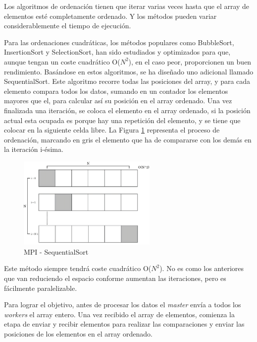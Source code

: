 	 


	
	
	Los algoritmos de ordenación tienen que iterar varias veces hasta que el array de elementos esté completamente ordenado. Y los métodos pueden variar considerablemente el tiempo de ejecución.
	
	Para las ordenaciones cuadráticas, los métodos populares como BubbleSort, InsertionSort y SelectionSort, han sido estudiados y optimizados para que, aunque tengan un coste cuadrático O(\(N^{2}\)), en el caso peor, proporcionen un buen rendimiento. Basándose en estos algoritmos, se ha diseñado uno adicional llamado SequentialSort. Este algoritmo recorre todas las posiciones del array, y para cada elemento compara todos los datos, sumando en un contador los elementos mayores que el, para calcular así su posición en el array ordenado. Una vez finalizada una iteración, se coloca el elemento en el array ordenado, si la posición actual esta ocupada es porque hay una repetición del elemento, y se tiene que colocar en la siguiente celda libre. La Figura \ref{fig:sequentialsortmpi} representa el proceso de ordenación, marcando en gris el elemento que ha de compararse con los demás en la iteración i-ésima.


	\begin{figure}[!h]
		\centering
		\includegraphics[width=0.6\textwidth]{images/chapter_3/sequentialsort_mpi}
		\caption{MPI - SequentialSort}
		\label{fig:sequentialsortmpi}
	\end{figure}
	
	Este método siempre tendrá coste cuadrático O(\(N^{2}\)). No es como los anteriores que van reduciendo el espacio conforme aumentan las iteraciones, pero es fácilmente paralelizable. 
	
	Para lograr el objetivo, antes de procesar los datos el \textit{master} envía a todos los \textit{workers} el array entero. Una vez recibido el array de elementos, comienza la etapa de enviar y recibir elementos para realizar las comparaciones y enviar las posiciones de los elementos en el array ordenado. 



